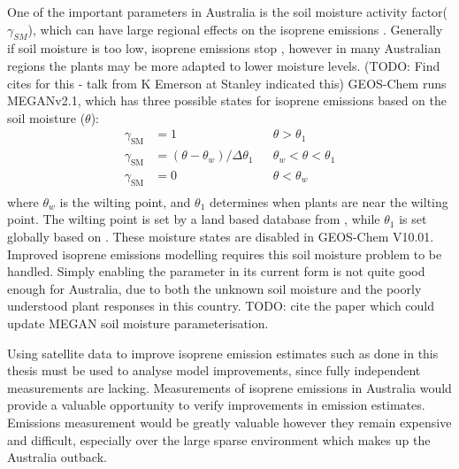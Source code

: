   One of the important parameters in Australia is the soil moisture activity factor($\gamma_{SM}$), which can have large regional effects on the isoprene emissions \parencite{Sindelarova2014,Bauwens2016}.
  Generally if soil moisture is too low, isoprene emissions stop \parencite{Pegoraro2004,Niinemets2010}, however in many Australian regions the plants may be more adapted to lower moisture levels. (TODO: Find cites for this - talk from K Emerson at Stanley indicated this)
  GEOS-Chem runs MEGANv2.1, which has three possible states for isoprene emissions based on the soil moisture ($\theta$):
  \begin{align*}
  \gamma_\mathrm{SM} & = 1 && \theta > \theta_1 \\
  \gamma_\mathrm{SM} & = (\theta-\theta_w)/\Delta\theta_1  && \theta_w < \theta < \theta_1 \\
  \gamma_\mathrm{SM} & = 0 && \theta < \theta_w \\
  \end{align*}
  where $\theta_w$ is the wilting point, and $\theta_1$ determines when plants are near the wilting point.
  The wilting point is set by a land based database from \textcite{Chen2001}, while $\theta_1$ is set globally based on \textcite{Pegoraro2004}.
  These moisture states are disabled in GEOS-Chem V10.01.
  Improved isoprene emissions modelling requires this soil moisture problem to be handled.
  Simply enabling the parameter in its current form is not quite good enough for Australia, due to both the unknown soil moisture and the poorly understood plant responses in this country.
  TODO: cite the paper which could update MEGAN soil moisture parameterisation.
  
  Using satellite data to improve isoprene emission estimates such as done in this thesis must be used to analyse model improvements, since fully independent measurements are lacking.
  Measurements of isoprene emissions in Australia would provide a valuable opportunity to verify improvements in emission estimates.
  Emissions measurement would be greatly valuable however they remain expensive and difficult, especially over the large sparse environment which makes up the Australia outback.